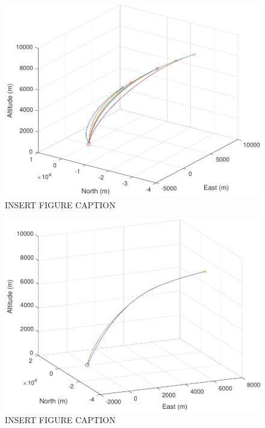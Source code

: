 \begin{figure}[H]
	\centering
	\begin{minipage}{4.5 in}
		\includegraphics[width=\linewidth]{Figures/trajpowvac.pdf}
		\caption{INSERT FIGURE CAPTION \label{fig:trajpowvac} }
	\end{minipage}
\end{figure}



\begin{figure}[H]
	\centering
	\begin{minipage}{4.5 in}
		\includegraphics[width=\linewidth]{Figures/trajsimvsadv.pdf}
		\caption{INSERT FIGURE CAPTION \label{fig:trajsimvsadv} }
	\end{minipage}
\end{figure}



